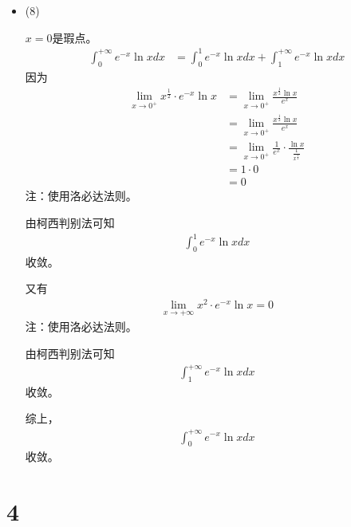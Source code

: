 \documentclass{article}
\begin{document}
\begin{itemize}
\begin{itemize}
                综上，$2 - \alpha \leq 0$，即$\alpha \geq 2$，发散。
        \end{itemize}

  \item (8)

        $x = 0$是瑕点。
        \begin{align*}
          \int_{0}^{+\infty} e^{-x} \ln x dx
           & = \int_{0}^{1} e^{-x} \ln x dx + \int_{1}^{+\infty} e^{-x} \ln x dx
        \end{align*}
        因为
        \begin{align*}
          \lim\limits_{x \to 0^+} x^{\frac{1}{2}} \cdot e^{-x} \ln x
           & = \lim\limits_{x \to 0^+} \frac{x^{\frac{1}{2}} \ln x}{e^x}                         \\
           & = \lim\limits_{x \to 0^+} \frac{x^{\frac{1}{2}} \ln x}{e^x}                         \\
           & = \lim\limits_{x \to 0^+} \frac{1}{e^x} \cdot \frac{\ln x}{\frac{1}{x^\frac{1}{2}}} \\
           & = 1 \cdot 0                                                                         \\
           & = 0
        \end{align*}
        注：使用洛必达法则。

        由柯西判别法可知
        \begin{align*}
          \int_{0}^{1} e^{-x} \ln x dx
        \end{align*}
        收敛。

        又有
        \begin{align*}
          \lim \limits_{x \to +\infty} x^2 \cdot e^{-x} \ln x = 0
        \end{align*}
        注：使用洛必达法则。

        由柯西判别法可知
        \begin{align*}
          \int_{1}^{+\infty} e^{-x} \ln x dx
        \end{align*}
        收敛。

        综上，
        \begin{align*}
          \int_{0}^{+\infty} e^{-x} \ln x dx
        \end{align*}
        收敛。
\end{itemize}

\section*{4}
\end{document}
